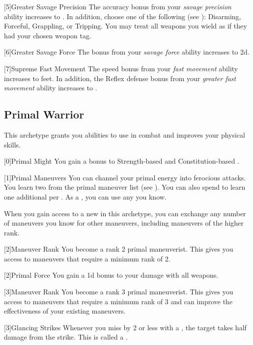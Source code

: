         [5]{Greater Savage Precision} The accuracy bonus from your \textit{savage precision} ability increases to .
        In addition, choose one of the following  (see ): Disarming, Forceful, Grappling, or Tripping.
        You may treat all weapons you wield as if they had your chosen weapon tag.

        [6]{Greater Savage Force} The bonus from your \textit{savage force} ability increases to \plus2d.

        [7]{Supreme Fast Movement} The speed bonus from your \textit{fast movement} ability increases to  feet.
        In addition, the Reflex defense bonus from your \textit{greater fast movement} ability increases to .

    \newpage
    \subsection{Primal Warrior}
        This archetype grants you abilities to use in combat and improves your physical skills.

        [0]{Primal Might} You gain a  bonus to Strength-based  and Constitution-based .

        {
            [1]{Primal Maneuvers}
            You can channel your primal energy into ferocious attacks.
            You learn two  from the primal maneuver list (see ).
            You can also spend  to learn one additional  per .
            As a , you can use any  you know.

            When you gain access to a new  in this archetype,
                you can exchange any number of maneuvers you know for other maneuvers,
                including maneuvers of the higher rank.
        }

        {
            [2]{Maneuver Rank} You become a rank 2 primal maneuverist.
            This gives you access to maneuvers that require a minimum rank of 2.

            [2]{Primal Force} You gain a \plus1d bonus to your damage with all weapons.
        }

        {
            [3]{Maneuver Rank} You become a rank 3 primal maneuverist.
            This gives you access to maneuvers that require a minimum rank of 3 and can improve the effectiveness of your existing maneuvers.

            [3]{Glancing Strikes} Whenever you miss by 2 or less with a , the target takes half damage from the strike.
            This is called a .
        }

